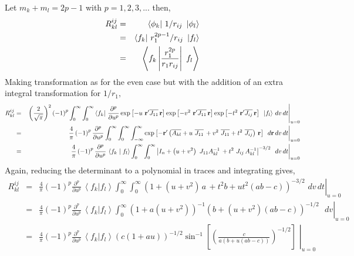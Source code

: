 \documentclass[12pt,doublespace]{article}
\begin{document}
Let $m_{k}+m_{l}=2p-1$ with $p=1,2,3,...$ then, 
\begin{eqnarray}
R_{kl}^{ij} &=&\left\langle \phi _{k}\right| \,1/r_{ij}\,\mathbf{\,}\left|
\phi _{l}\right\rangle \\
&=&\left\langle f_{k}\right| \,r_{1}^{2p-1}/r_{ij}\,\mathbf{\,}\left|
f_{l}\right\rangle \\
&=&\left\langle f_{k}\left| \frac{r_{1}^{2p}}{r_{1}r_{ij}}\right| \,\mathbf{%
\,}f_{l}\right\rangle
\end{eqnarray}
Making transformation as for the even case but with the addition of an extra
integral transformation for $1/r_{1},$%
\begin{eqnarray}
R_{kl}^{ij} &=&\left. \left( \frac{2}{\sqrt{\pi }}\right) ^{2}\left(
-1\right) ^{p}\int_{0}^{\infty }\int_{0}^{\infty }\left\langle f_{k}\right|
\,\frac{\partial ^{p}}{\partial u^{p}}\exp \left[ -u\,\,\mathbf{r}^{\prime }%
\overline{J_{11}}\,\mathbf{r}\right] \exp \left[ -v^{2}\,\,\mathbf{r}%
^{\prime }\overline{J_{11}}\,\mathbf{r}\right] \exp \left[ -t^{2}\,\,\mathbf{%
r}^{\prime }\overline{J_{ij}}\,\mathbf{r}\right] \,\mathbf{\,}\left|
f_{l}\right\rangle \,dv\,dt\right| _{u=0} \\
&=&\left. \frac{4}{\pi }\left( -1\right) ^{p}\frac{\partial ^{p}}{\partial
u^{p}}\int_{0}^{\infty }\int_{0}^{\infty }\int_{-\infty }^{\infty }\exp %
\left[ -\mathbf{r}^{\prime }\left( \overline{A_{kl}}+u\,\,\overline{J_{11}}%
\,+v^{2}\,\,\overline{J_{11}}+t^{2}\,\,\overline{J_{ij}}\right) \,\mathbf{r}%
\right] \,\mathbf{\,}\,d\mathbf{r}\,dv\,dt\right| _{u=0} \\
&=&\left. \frac{4}{\pi }\left( -1\right) ^{p}\frac{\partial ^{p}}{\partial
u^{p}}\,\left\langle f_{k}\right. |\left. f_{l}\right\rangle
\int_{0}^{\infty }\int_{0}^{\infty }\left| I_{n}+\left( u+v^{2}\right)
\,\,J_{11}A_{kl}^{-1}\,+t^{2}\,\,J_{ij}\,A_{kl}^{-1}\right| ^{-3/2}\mathbf{\,%
}\,\,dv\,dt\right| _{u=0}
\end{eqnarray}
Again, reducing the determinant to a polynomial in traces and integrating
gives, 
\begin{eqnarray}
R_{kl}^{ij} &=&\left. \frac{4}{\pi }\left( -1\right) ^{p}\frac{\partial ^{p}%
}{\partial u^{p}}\,\left\langle f_{k}\right. |\left. f_{l}\right\rangle
\int_{0}^{\infty }\int_{0}^{\infty }\left( 1+\left( u+v^{2}\right)
\,a\,+t^{2}b+ut^{2}\left( ab-c\right) \right) ^{-3/2}\mathbf{\,}%
\,dv\,dt\right| _{u=0} \\
&=&\left. \frac{4}{\pi }\left( -1\right) ^{p}\frac{\partial ^{p}}{\partial
u^{p}}\,\left\langle f_{k}\right. |\left. f_{l}\right\rangle
\int_{0}^{\infty }\left( 1+a\left( u+v^{2}\right) \right) ^{-1}\left(
b+\left( u+v^{2}\right) \left( ab-c\right) \right) ^{-1/2}\mathbf{\,}%
\,\,\,dv\right| _{u=0} \\
&=&\left. \frac{4}{\pi }\left( -1\right) ^{p}\frac{\partial ^{p}}{\partial
u^{p}}\,\left\langle f_{k}\right. |\left. f_{l}\right\rangle \left( c\left(
1+au\right) \right) ^{-1/2}\sin ^{-1}\left[ \left( \frac{c}{a\left(
b+u\left( ab-c\right) \right) }\right) ^{-1/2}\right] \mathbf{\,}\,\right|
_{u=0}
\end{eqnarray}
\end{document}
